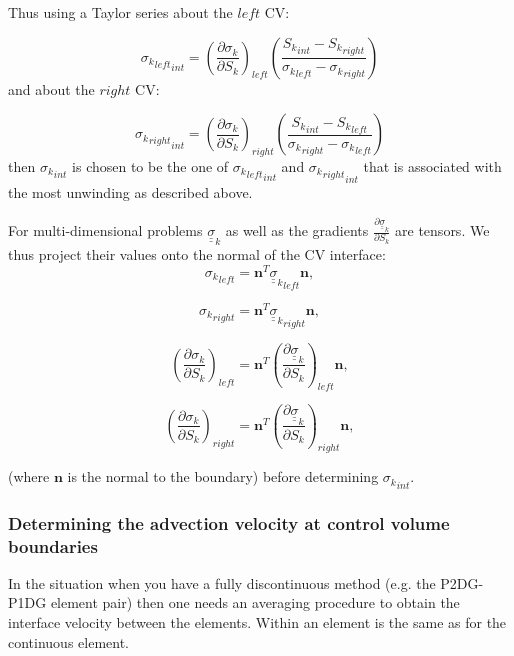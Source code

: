 Thus using a Taylor series about the $left$ CV:

\begin{equation}
{{\sigma_k}_{left}}_{int}
=
\left( 
\frac{\partial \sigma_k}{\partial {S_k}}
\right)_{left}
\left( 
\frac{ 
 {S_k}_{int} - {S_k}_{right} } 
{{\sigma_k}_{left} - {\sigma_k}_{right} }
\right) 
\end{equation}
and about the $right$ CV:

\begin{equation}
{{\sigma_k}_{right}}_{int}
=
\left( \frac{\partial \sigma_k}{\partial {S_k}}
\right)_{right}
\left( 
\frac{ 
 {S_k}_{int} - {S_k}_{left} } 
{{\sigma_k}_{right} - {\sigma_k}_{left} }
\right) 
\end{equation}
then ${{\sigma_k}}_{int}$ is chosen to be the one 
of ${{\sigma_k}_{left}}_{int}$ and ${{\sigma_k}_{right}}_{int}$
that is associated with the most unwinding as described above.


For multi-dimensional problems ${\underline {\underline \sigma}}_k$ as well 
as the gradients $\frac{\partial {\underline {\underline \sigma}}_k}{\partial S_k}$ 
are tensors. We thus project their values 
onto the normal of the CV interface:
\begin{equation}
{\sigma_k}_{left} = {\mathbf n}^T {{\underline {\underline \sigma}}_k}_{left} {\mathbf n},
\end{equation}

\begin{equation}
{\sigma_k}_{right} = {\mathbf n}^T {{\underline {\underline \sigma}}_k}_{right} {\mathbf n}, 
\end{equation}

\begin{equation}
\left({\frac{\partial \sigma_k}{\partial S_k}}\right)_{left} = 
{\mathbf n}^T \left( {\frac{\partial {\underline {\underline \sigma}}_k}{\partial S_k}}\right)_{left} {\mathbf n}, 
\end{equation}

\begin{equation}
\left({\frac{\partial \sigma_k}{\partial S_k}}\right)_{right} = {\mathbf n}^T 
\left( \frac{\partial {\underline {\underline \sigma}}_k}{\partial S_k}\right)_{right} {\mathbf n}, 
\end{equation}

(where ${\mathbf n}$ is the normal to the boundary) 
before determining ${\sigma_k}_{int}$.  




\subsubsection{Determining the advection velocity at control volume boundaries}  
In the situation when you have a fully discontinuous method (e.g. the P2DG-P1DG element pair) then 
one needs an averaging procedure to obtain the interface velocity between the elements. 
Within an element is the same as for the continuous element.   



